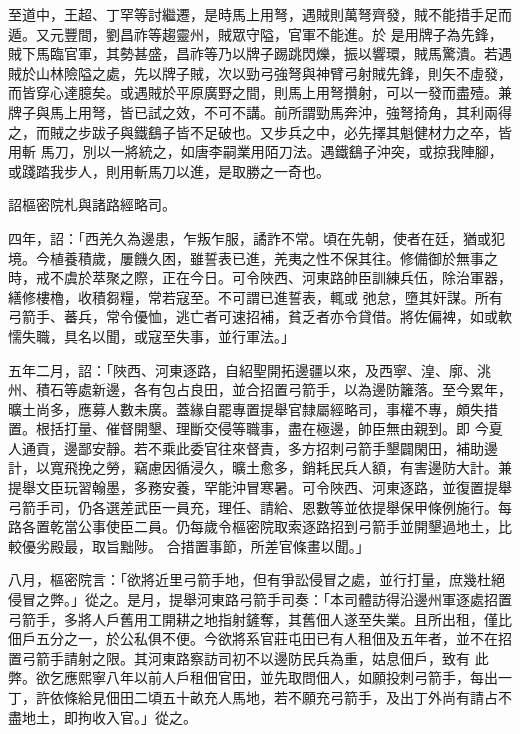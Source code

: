 \begin{pinyinscope}
 至道中，王超、丁罕等討繼遷，是時馬上用弩，遇賊則萬弩齊發，賊不能措手足而遁。又元豐間，劉昌祚等趨靈州，賊眾守隘，官軍不能進。於
 是用牌子為先鋒，賊下馬臨官軍，其勢甚盛，昌祚等乃以牌子踢跳閃爍，振以響環，賊馬驚潰。若遇賊於山林險隘之處，先以牌子賊，次以勁弓強弩與神臂弓射賊先鋒，則矢不虛發，而皆穿心達臆矣。或遇賊於平原廣野之間，則馬上用弩攢射，可以一發而盡殪。兼牌子與馬上用弩，皆已試之效，不可不講。前所謂勁馬奔沖，強弩掎角，其利兩得之，而賊之步跋子與鐵鷂子皆不足破也。又步兵之中，必先擇其魁健材力之卒，皆用斬
 馬刀，別以一將統之，如唐李嗣業用陌刀法。遇鐵鷂子沖突，或掠我陣腳，或踐踏我步人，則用斬馬刀以進，是取勝之一奇也。



 詔樞密院札與諸路經略司。



 四年，詔：「西羌久為邊患，乍叛乍服，譎詐不常。頃在先朝，使者在廷，猶或犯境。今植養積歲，屢饑久困，雖誓表已進，羌夷之性不保其往。修備御於無事之時，戒不虞於萃聚之際，正在今日。可令陜西、河東路帥臣訓練兵伍，除治軍器，繕修樓櫓，收積芻糧，常若寇至。不可謂已進誓表，輒或
 弛怠，墮其奸謀。所有弓箭手、蕃兵，常令優恤，逃亡者可速招補，貧乏者亦令貸借。將佐偏裨，如或軟懦失職，具名以聞，或寇至失事，並行軍法。」



 五年二月，詔：「陜西、河東逐路，自紹聖開拓邊疆以來，及西寧、湟、廓、洮州、積石等處新邊，各有包占良田，並合招置弓箭手，以為邊防籬落。至今累年，曠土尚多，應募人數未廣。蓋緣自罷專置提舉官隸屬經略司，事權不專，頗失措置。根括打量、催督開墾、理斷交侵等職事，盡在極邊，帥臣無由親到。即
 今夏人通貢，邊鄙安靜。若不乘此委官往來督責，多方招刺弓箭手墾闢閑田，補助邊計，以寬飛挽之勞，竊慮因循浸久，曠土愈多，銷耗民兵人額，有害邊防大計。兼提舉文臣玩習翰墨，多務安養，罕能沖冒寒暑。可令陜西、河東逐路，並復置提舉弓箭手司，仍各選差武臣一員充，理任、請給、恩數等並依提舉保甲條例施行。每路各置乾當公事使臣二員。仍每歲令樞密院取索逐路招到弓箭手並開墾過地土，比較優劣殿最，取旨黜陟。
 合措置事節，所差官條畫以聞。」



 八月，樞密院言：「欲將近里弓箭手地，但有爭訟侵冒之處，並行打量，庶幾杜絕侵冒之弊。」從之。是月，提舉河東路弓箭手司奏：「本司體訪得沿邊州軍逐處招置弓箭手，多將人戶舊用工開耕之地指射鏟奪，其舊佃人遂至失業。且所出租，僅比佃戶五分之一，於公私俱不便。今欲將系官莊屯田已有人租佃及五年者，並不在招置弓箭手請射之限。其河東路察訪司初不以邊防民兵為重，姑息佃戶，致有
 此弊。欲乞應熙寧八年以前人戶租佃官田，並先取問佃人，如願投刺弓箭手，每出一丁，許依條給見佃田二頃五十畝充人馬地，若不願充弓箭手，及出丁外尚有請占不盡地土，即拘收入官。」從之。




\end{pinyinscope}
